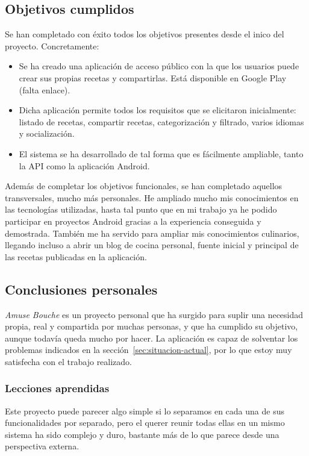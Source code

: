 \documentclass[a4paper,12pt]{article}
\begin{document}
\subsection{Objetivos cumplidos}

Se han completado con éxito todos los objetivos presentes desde el inico del
proyecto. Concretamente:

\begin{itemize}
\item Se ha creado una aplicación de acceso público con la que los usuarios
  puede crear sus propias recetas y compartirlas. Está disponible en Google
  Play (falta enlace).
\item Dicha aplicación permite todos los requisitos que se elicitaron
  inicialmente: listado de recetas, compartir recetas, categorización y filtrado,
  varios idiomas y socialización.
\item El sistema se ha desarrollado de tal forma que es fácilmente ampliable,
  tanto la API como la aplicación Android.
\end{itemize}

Además de completar los objetivos funcionales, se han completado aquellos
transversales, mucho más personales. He ampliado mucho mis conocimientos en las
tecnologías utilizadas, hasta tal punto que en mi trabajo ya he podido
participar en proyectos Android gracias a la experiencia conseguida y
demostrada. También me ha servido para ampliar mis conocimientos culinarios,
llegando incluso a abrir un blog de cocina personal,\cite{noeliarcado} fuente
inicial y principal de las recetas publicadas en la aplicación.

\subsection{Conclusiones personales}

\textit{Amuse Bouche} es un proyecto personal que ha surgido para suplir una
necesidad propia, real y compartida por muchas personas, y que ha cumplido su
objetivo, aunque todavía queda mucho por hacer. La aplicación es capaz de
solventar los problemas indicados en la sección~\ref{sec:situacion-actual}, por
lo que estoy muy satisfecha con el trabajo realizado.

\subsubsection{Lecciones aprendidas}

Este proyecto puede parecer algo simple si lo separamos en cada una de sus
funcionalidades por separado, pero el querer reunir todas ellas en un mismo
sistema ha sido complejo y duro, bastante más de lo que parece desde una
perspectiva externa.
\end{document}
